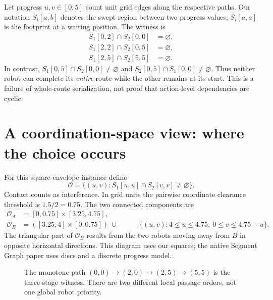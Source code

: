 \documentclass[11pt,a4paper]{article}
\begin{document}
Let progress $u,v\in[0,5]$ count unit grid edges along the respective paths.
Our notation $S_i[a,b]$ denotes the swept region between two progress values;
$S_i[a,a]$ is the footprint at a waiting position. The witness is
\begin{equation}
\begin{split}
S_1[0,2]\cap S_2[0,0]&=\varnothing,\\
S_1[2,2]\cap S_2[0,5]&=\varnothing,\\
S_1[2,5]\cap S_2[5,5]&=\varnothing.
\end{split}\label{eq:witness}
\end{equation}
In contrast, $S_1[0,5]\cap S_2[0,0]\ne\varnothing$ and
$S_2[0,5]\cap S_1[0,0]\ne\varnothing$. Thus neither robot can complete its
\emph{entire} route while the other remains at its start. This is a failure of
whole-route serialization, not proof that action-level dependencies are cyclic.

\clearpage
\section{A coordination-space view: where the choice occurs}
For this square-envelope instance define
\begin{equation}
\mathcal O=\{(u,v): S_1[u,u]\cap S_2[v,v]\ne\varnothing\}.
\end{equation}
Contact counts as interference. In grid units the pairwise coordinate clearance
threshold is $1.5/2=0.75$. The two connected components are
\begin{align}
\mathcal O_A&=[0,0.75]\times[3.25,4.75],\\
\mathcal O_B&=([3.25,4]\times[0,0.75])\ \cup\
 &\qquad\{(u,v):4\le u\le4.75,\ 0\le v\le4.75-u\}.\nonumber
\end{align}
The triangular part of $\mathcal O_B$ results from the two robots moving away
from $B$ in opposite horizontal directions. This diagram uses our squares;
the native Segment Graph paper uses discs and a discrete progress model.

\begin{figure}[h]
\centering
{}
\caption{The monotone path $(0,0)\to(2,0)\to(2,5)\to(5,5)$ is the three-stage
witness. There are two different local passage orders, not one global robot priority.}
\end{figure}
\end{document}
